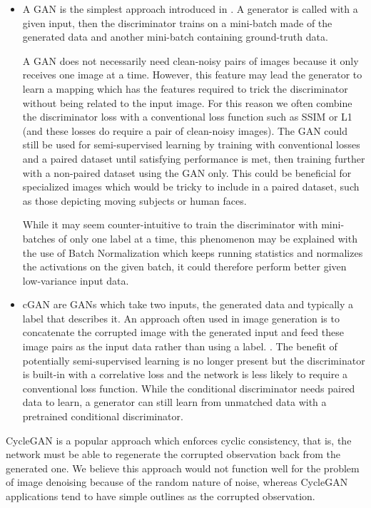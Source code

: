 \begin{itemize}
  \item A \ac{GAN} is the simplest approach introduced in \cite{gan}. A generator is called with a given input, then the discriminator trains on a mini-batch made of the generated data and another mini-batch containing ground-truth data.

A \ac{GAN} does not necessarily need clean-noisy pairs of images because it only receives one image at a time. However, this feature may lead the generator to learn a mapping which has the features required to trick the discriminator without being related to the input image. For this reason we often combine the discriminator loss with a conventional loss function such as SSIM or L1 (and these losses do require a pair of clean-noisy images). The GAN could still be used for semi-supervised learning by training with conventional losses and a paired dataset until satisfying performance is met, then training further with a non-paired dataset using the GAN only. This could be beneficial for specialized images which would be tricky to include in a paired dataset, such as those depicting moving subjects or human faces.

While it may seem counter-intuitive to train the discriminator with mini-batches of only one label at a time, this phenomenon may be explained with the use of Batch Normalization which keeps running statistics and normalizes the activations on the given batch, it could therefore perform better given low-variance input data. \cite{gantechniques}\cite{bn} %
  \item \ac{cGAN} are \acsp{GAN} which take two inputs, the generated data and typically a label that describes it. An approach often used in image generation is to concatenate the corrupted image with the generated input and feed these image pairs as the input data rather than using a label. \cite{pix2pix}\cite{cyclegan}\cite{pix2pixhd}. The benefit of potentially semi-supervised learning is no longer present but the discriminator is built-in with a correlative loss and the network is less likely to require a conventional loss function. While the conditional discriminator needs paired data to learn, a generator can still learn from unmatched data with a pretrained conditional discriminator.
\end{itemize}
CycleGAN\cite{cyclegan} is a popular approach which enforces cyclic consistency, that is, the network must be able to regenerate the corrupted observation back from the generated one. We believe this approach would not function well for the problem of image denoising because of the random nature of noise, whereas CycleGAN applications tend to have simple outlines as the corrupted observation.

